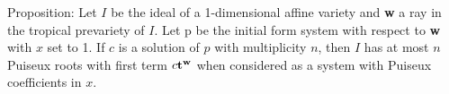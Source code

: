 \documentclass[12pt]{amsart}
\date{\today}
\author{Nathan Bliss \and Jan Verschelde}
\begin{document}
Proposition: Let $I$ be the ideal of a 1-dimensional affine variety and {\bf w} a ray in the tropical prevariety of $I$. Let {\bf} p be the initial form system with respect to {\bf w} with $x$ set to 1. If $c$ is a solution of $p$ with multiplicity $n$, then $I$ has at most $n$ Puiseux roots with first term $c{\bf t^w}$ when considered as a system with Puiseux coefficients in $x$.
\end{document}
